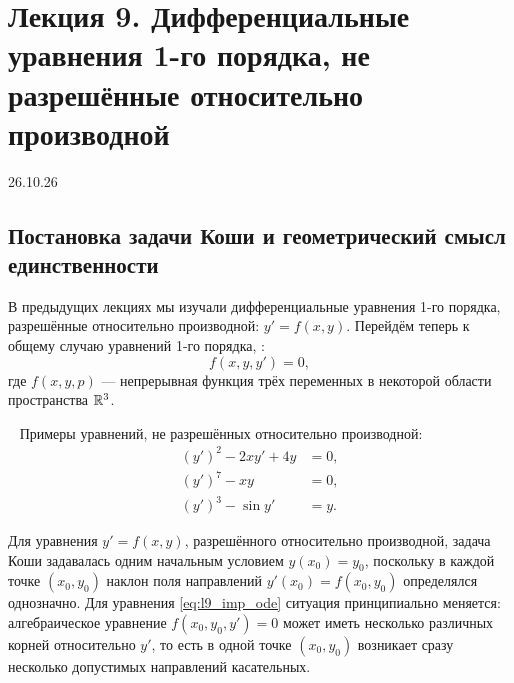 \section{Лекция 9. Дифференциальные уравнения 1-го порядка, не разрешённые относительно производной}

\begin{flushright}
    26.10.26
\end{flushright}

\subsection{Постановка задачи Коши и геометрический смысл единственности}

В предыдущих лекциях мы изучали дифференциальные уравнения 1-го порядка,
разрешённые относительно производной: $y' = f(x, y)$. Перейдём теперь к
общему случаю уравнений 1-го порядка, :
\begin{equation} \label{eq:l9_imp_ode}
    f(x, y, y') = 0, \tag{1}
\end{equation}
где $f(x, y, p)$ — непрерывная функция трёх переменных в некоторой области
пространства $\mathbb{R}^3$.

\begin{example} ~
    Примеры уравнений, не разрешённых относительно производной:
    \begin{align*}
        (y')^2 - 2 x y' + 4 y &= 0, \\
        (y')^7 - x y &= 0, \\
        (y')^3 - \sin y' &= y.
    \end{align*}
\end{example}

Для уравнения $y' = f(x, y)$, разрешённого относительно производной, задача
Коши задавалась одним начальным условием $y(x_0) = y_0$, поскольку в каждой
точке $(x_0, y_0)$ наклон поля направлений $y'(x_0) = f(x_0, y_0)$ определялся
однозначно. Для уравнения \eqref{eq:l9_imp_ode} ситуация принципиально меняется:
алгебраическое уравнение $f(x_0, y_0, y') = 0$ может иметь несколько различных
корней относительно $y'$, то есть в одной точке $(x_0, y_0)$ возникает сразу
несколько допустимых направлений касательных.

